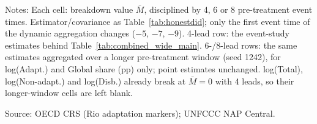 \begin{table}[H]
\centering
\caption{HonestDiD breakdown value $\bar{M}$ by the number of pre-treatment periods used}
\label{tab:honestdid_prepriods}
\begingroup\small
{}
\endgroup
\par\vspace{4pt}
\begin{minipage}{\linewidth}\footnotesize
Notes: Each cell: breakdown value $\bar{M}$, disciplined by 4, 6 or 8 pre-treatment event times. Estimator/covariance as Table~\ref{tab:honestdid}; only the first event time of the dynamic aggregation changes ($-5$, $-7$, $-9$). 4-lead row: the event-study estimates behind Table~\ref{tab:combined_wide_main}. 6-/8-lead rows: the same estimates aggregated over a longer pre-treatment window (seed 1242), for log(Adapt.) and Global share (pp) only; point estimates unchanged. log(Total), log(Non-adapt.) and log(Disb.) already break at $\bar{M} = 0$ with 4 leads, so their longer-window cells are left blank.\par
Source: OECD CRS (Rio adaptation markers); UNFCCC NAP Central.
\end{minipage}
\end{table}
